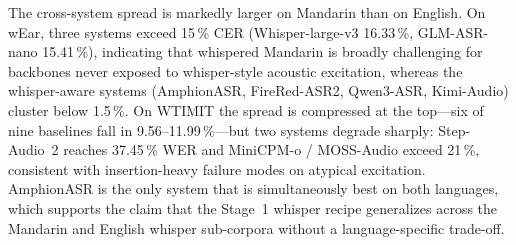 The cross-system spread is markedly larger on Mandarin than on English.
On wEar, three systems exceed 15\,\% CER (Whisper-large-v3 16.33\,\%,
GLM-ASR-nano 15.41\,\%), indicating that whispered Mandarin is broadly
challenging for backbones never exposed to whisper-style acoustic
excitation, whereas the whisper-aware systems (AmphionASR, FireRed-ASR2,
Qwen3-ASR, Kimi-Audio) cluster below 1.5\,\%. On WTIMIT the spread is
compressed at the top---six of nine baselines fall in
9.56--11.99\,\%---but two systems degrade sharply: Step-Audio~2 reaches
37.45\,\% WER and MiniCPM-o / MOSS-Audio exceed 21\,\%, consistent with
insertion-heavy failure modes on atypical excitation. AmphionASR is the
only system that is simultaneously best on both languages, which
supports the claim that the Stage~1 whisper recipe generalizes across
the Mandarin and English whisper sub-corpora without a language-specific
trade-off.
